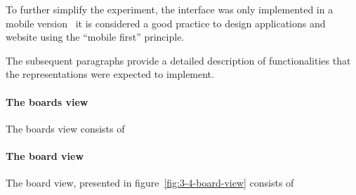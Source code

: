 To further simplify the experiment, the interface was only implemented in a mobile version \textendash\ it is considered a good practice to design applications and website using the \enquote{mobile first} principle.%

The subsequent paragraphs provide a detailed description of functionalities that the representations were expected to implement.

\paragraph{The boards view}
The boards view consists of\textellipsis

\paragraph{The board view}
The board view, presented in figure~\ref{fig:3-4-board-view} consists of\textellipsis

